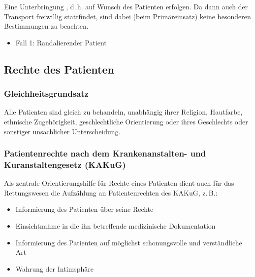 {
Eine Unterbringung , d.\,h. auf
Wunsch des Patienten erfolgen. Da dann auch der Transport
freiwillig stattfindet, sind dabei (beim Primäreinsatz)
keine besonderen Bestimmungen zu beachten.
}
{}
{}
{}
{}

{
\begin{itemize}
  \item Fall 1: Randalierender Patient
  \dotfill{}
\end{itemize}
}
{}
{}
{}
{}


\subsection{Rechte des Patienten}

\label{topic:patientenrechte}

\subsubsection{Gleichheitsgrundsatz}


Alle Patienten sind gleich zu behandeln, unabhängig
ihrer Religion, Hautfarbe, ethnische Zugehörigkeit,
geschlechtliche Orientierung oder ihres Geschlechts oder
sonstiger unsachlicher Unterscheidung.

\subsubsection{Patientenrechte nach dem
Krankenanstalten- und Kuranstaltengesetz (KAKuG)}

Als zentrale Orientierungshilfe für Rechte eines Patienten
dient auch für das Rettungswesen die Aufzählung an
Patientenrechten des KAKuG,
z.\,B.:

\begin{itemize}
  \item Informierung des Patienten über seine Rechte
  \item Einsichtnahme in die ihn betreffende
  medizinische Dokumentation
  \item Informierung des Patienten auf möglichst
  schonungsvolle und verständliche Art
  \item Wahrung der Intimsphäre
\end{itemize}


